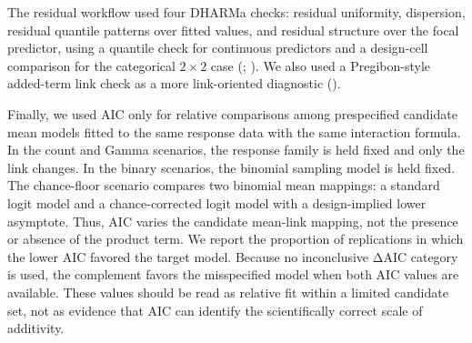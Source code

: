 \documentclass[
  man,
  longtable,
  nolmodern,
  notxfonts,
  notimes,
  colorlinks=true,linkcolor=blue,citecolor=blue,urlcolor=blue]{apa7}
\begin{document}
The residual workflow used four DHARMa checks: residual uniformity,
dispersion, residual quantile patterns over fitted values, and residual
structure over the focal predictor, using a quantile check for
continuous predictors and a design-cell comparison for the categorical
\(2 \times 2\) case (;
). We also used a Pregibon-style
added-term link check as a more link-oriented diagnostic
().

Finally, we used AIC only for relative comparisons among prespecified
candidate mean models fitted to the same response data with the same
interaction formula. In the count and Gamma scenarios, the response
family is held fixed and only the link changes. In the binary scenarios,
the binomial sampling model is held fixed. The chance-floor scenario
compares two binomial mean mappings: a standard logit model and a
chance-corrected logit model with a design-implied lower asymptote.
Thus, AIC varies the candidate mean-link mapping, not the presence or
absence of the product term. We report the proportion of replications in
which the lower AIC favored the target model. Because no inconclusive
ΔAIC category is used, the complement favors the misspecified model when
both AIC values are available. These values should be read as relative
fit within a limited candidate set, not as evidence that AIC can
identify the scientifically correct scale of additivity.
\end{document}
